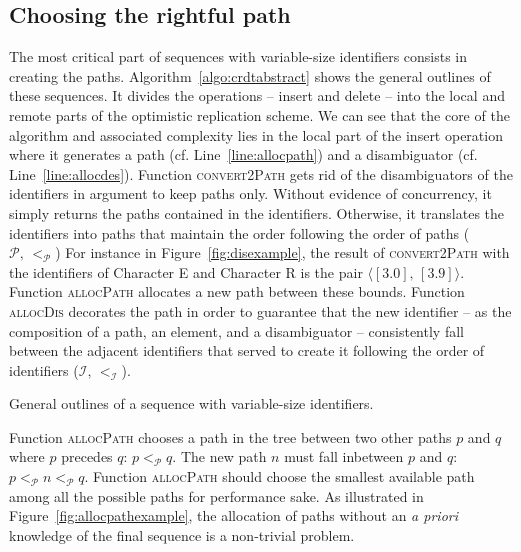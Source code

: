 \subsection{Choosing the rightful path}
\label{subsec:choosing}

The most critical part of sequences with variable-size identifiers consists in
creating the paths. Algorithm~\ref{algo:crdtabstract} shows the general outlines
of these sequences. It divides the operations -- insert and delete -- into the
local and remote parts of the optimistic replication scheme. We can see that the
core of the algorithm and associated complexity lies in the local part of the
insert operation where it generates a path (cf. Line~\ref{line:allocpath}) and a
disambiguator (cf. Line~\ref{line:allocdes}). Function \textsc{convert2Path}
gets rid of the disambiguators of the identifiers in argument to keep paths
only. Without evidence of concurrency, it simply returns the paths contained in
the identifiers. Otherwise, it translates the identifiers into paths that
maintain the order following the order of paths
($\mathcal{P},\, <_{\mathcal{P}}$) For instance in Figure~\ref{fig:disexample},
the result of \textsc{convert2Path} with the identifiers of Character E and
Character R is the pair $\langle [3.0],\, [3.9]\rangle$. Function
\textsc{allocPath} allocates a new path between these bounds. Function
\textsc{allocDis} decorates the path in order to guarantee that the new
identifier -- as the composition of a path, an element, and a disambiguator --
consistently fall between the adjacent identifiers that served to create it
following the order of identifiers ($\mathcal{I}, \, <_\mathcal{I}$).

\begin{algorithm}[h]
  
  \caption{\label{algo:crdtabstract}General outlines of a sequence with
    variable-size identifiers.}
\end{algorithm}

Function \textsc{allocPath} chooses a path in the tree between two other paths
$p$ and $q$ where $p$ precedes $q$: $p<_{\mathcal{P}}q$. The new path $n$ must
fall inbetween $p$ and $q$: $p<_\mathcal{P}n<_\mathcal{P}q$. 
Function \textsc{allocPath} should choose the smallest available path among all
the possible paths for performance sake.
As illustrated in Figure~\ref{fig:allocpathexample}, the allocation of paths
without an \emph{a priori} knowledge of the final sequence is a non-trivial
problem.

